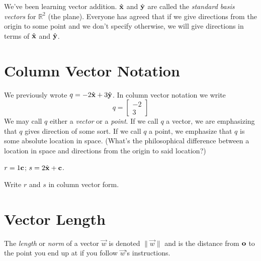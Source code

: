 \documentclass[letter]{article}
\newcommand{\xh}{\hat{\bf x}}
\newcommand{\yh}{\hat{\bf y}}
\newcommand{\R}{\mathbb{R}}
\begin{document}
	We've been learning vector addition. $\xh$ and $\yh$ are called the \emph{standard
	basis vectors} for $\R^2$ (the plane).  Everyone has agreed that if we give directions
	from the origin to some point and we don't specify otherwise, we will give directions
	in terms of $\xh$ and $\yh$.

\section*{Column Vector Notation}
	We previously wrote $q=-2\xh+3\yh$.  In column vector notation we write
	\[
		q=\begin{bmatrix}-2\\3\end{bmatrix}
	\]
	We may call $q$ either a \emph{vector} or a \emph{point}.  If we call $q$ a vector,
	we are emphasizing that $q$ gives direction of some sort.  If we call $q$ a point,
	we emphasize that $q$ is some absolute location in space. (What's the philosophical
	difference between a location in space and directions from the origin to said location?)

	$r=1\bf c$; $s=2\xh+\bf c$.
	\begin{Enum}
		\item Write $r$ and $s$ in column vector form.
	\end{Enum}

\section*{Vector Length}
	The \emph{length} or \emph{norm} of a vector $\vec w$ is denoted $\|\vec w\|$ and is the distance
	from $\bf o$ to the point you end up at if you follow $\vec w$'s instructions.
\end{document}
